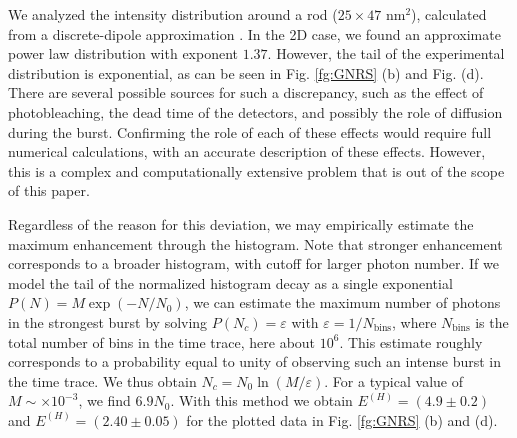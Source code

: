 We analyzed the intensity distribution around a rod ($25\times47$ nm$^2$), calculated 
from a discrete-dipole approximation \cite{khatua2014resonant}. In the 2D case, we found an 
approximate power law distribution with exponent $1.37$. However, the tail of the 
experimental distribution is exponential, as can be seen in Fig. \ref{fg:GNRS} (b) and  Fig. (d).
There are several possible sources for such a discrepancy, such as the effect of photobleaching,
the dead time of the detectors, and possibly the role of diffusion during the burst.
Confirming the role of each of these effects would require full numerical calculations, with 
an accurate description of these effects. However, this is a complex and computationally 
extensive problem that is out of the scope of this paper.


Regardless of the reason for this deviation, we may empirically estimate
the maximum enhancement through the histogram. Note that stronger enhancement 
corresponds to a broader histogram, with cutoff for larger photon number.
If we model the tail of the normalized histogram decay as a single exponential $P(N)=M\exp(-N/N_0)$, 
we can estimate the maximum number of photons in the strongest burst by solving 
$P(N_c)=\varepsilon$ with $\varepsilon=1/N_{\mbox{bins}}$, where $N_{\mbox{bins}}$ is 
the total number of bins in the time trace, here about $10^6$. This estimate roughly 
corresponds to a probability equal to unity of observing such an intense burst in the 
time trace. We thus obtain $N_c = N_0 \ln(M/\varepsilon)$. For a typical value of 
$M\sim\times10^{-3}$, we find $6.9 N_0$. With this method we obtain $E^{(H)}=(4.9 \pm 0.2)$ 
and $E^{(H)}=(2.40 \pm 0.05)$ for the plotted data in Fig. \ref{fg:GNRS} (b) and (d).


